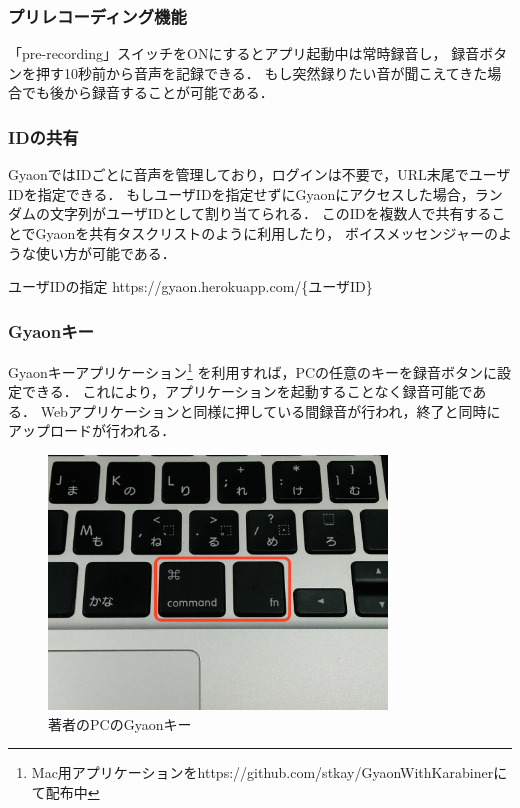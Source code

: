 \subsubsection{プリレコーディング機能}
「pre-recording」スイッチをONにするとアプリ起動中は常時録音し，
録音ボタンを押す10秒前から音声を記録できる．
もし突然録りたい音が聞こえてきた場合でも後から録音することが可能である．

\subsubsection{IDの共有}
GyaonではIDごとに音声を管理しており，ログインは不要で，URL末尾でユーザIDを指定できる．
もしユーザIDを指定せずにGyaonにアクセスした場合，ランダムの文字列がユーザIDとして割り当てられる．
このIDを複数人で共有することでGyaonを共有タスクリストのように利用したり，
ボイスメッセンジャーのような使い方が可能である．

\begin{itembox}[l]
{ユーザIDの指定}
https://gyaon.herokuapp.com/\{ユーザID\}
\end{itembox}

\subsubsection{Gyaonキー}
Gyaonキーアプリケーション\footnote{\textsf{Mac用アプリケーションをhttps://github.com/stkay/GyaonWithKarabinerにて配布中}}
を利用すれば，PCの任意のキーを録音ボタンに設定できる．
これにより，アプリケーションを起動することなく録音可能である．
Webアプリケーションと同様に押している間録音が行われ，終了と同時にアップロードが行われる．

\begin{figure}[H]
\centering
\includegraphics[width=9cm]{images/key.png}
\caption{著者のPCのGyaonキー}
\label{key}
\end{figure}

